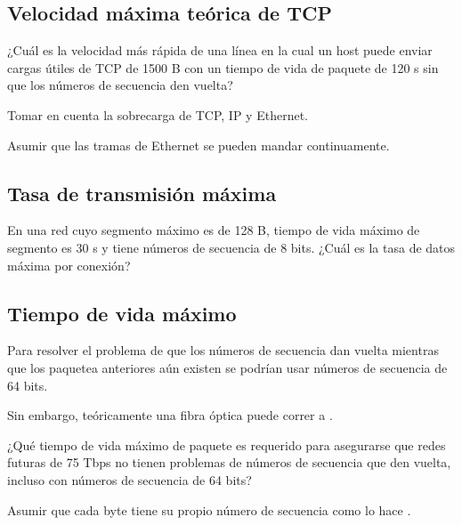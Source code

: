 \documentclass[12pt]{report}
\begin{document}
\begin{exer}
\subsection{Velocidad máxima teórica de TCP \sfour \shard}
¿Cuál es la velocidad más rápida de una línea en la cual un host puede enviar
cargas útiles de TCP de 1500 B con un tiempo de vida de paquete de 120 s sin que los
números de secuencia den vuelta?

Tomar en cuenta la sobrecarga de TCP, IP y Ethernet.

Asumir que las tramas de Ethernet se pueden mandar continuamente.
\end{exer}

\begin{exer}
\subsection{Tasa de transmisión máxima \sthree}
En una red cuyo segmento máximo es de 128 B, tiempo de vida máximo de
segmento es 30 s y tiene números de secuencia de 8 bits. ¿Cuál es la tasa de datos máxima
por conexión?
\end{exer}

\begin{exer}
\subsection{Tiempo de vida máximo \sthree}
Para resolver el problema de que los números de secuencia dan vuelta mientras
que los paquetea anteriores aún existen se podrían usar números de secuencia de 64 bits.

Sin embargo, teóricamente una fibra óptica puede correr a .

¿Qué tiempo de vida máximo de paquete es requerido para asegurarse que redes futuras de 75 Tbps no tienen problemas de números de secuencia que den vuelta, incluso con números de secuencia de 64 bits?

Asumir que cada byte tiene su propio número de secuencia como lo hace . 
\end{exer}
\end{document}
